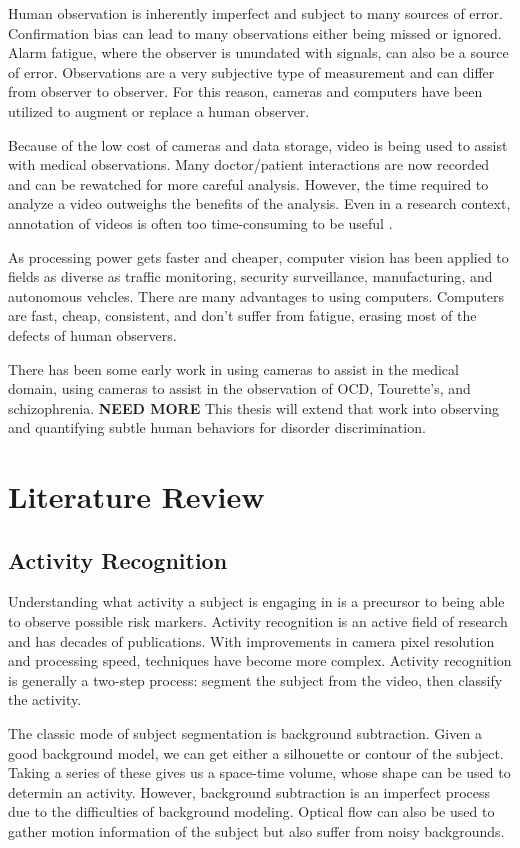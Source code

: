 \documentclass[11pt]{article}
\begin{document}
Human observation is inherently imperfect and subject to many sources of error. Confirmation bias can lead to many observations either being missed or ignored. Alarm fatigue, where the observer is unundated with signals, can also be a source of error. Observations are a very subjective type of measurement and can differ from observer to observer. For this reason, cameras and computers have been utilized to augment or replace a human observer.

Because of the low cost of cameras and data storage, video is being used to assist with medical observations. Many doctor/patient interactions are now recorded and can be rewatched for more careful analysis. However, the time required to analyze a video outweighs the benefits of the analysis. Even in a research context, annotation of videos is often too time-consuming to be useful\cite{fasching2016} \cite{walkup1992}.

As processing power gets faster and cheaper, computer vision has been applied to fields as diverse as traffic monitoring\cite{Gupte}, security surveillance\cite{bird2006}, manufacturing\cite{saurez2018}, and autonomous vehcles. There are many advantages to using computers. Computers are fast, cheap, consistent, and don't suffer from fatigue, erasing most of the defects of human observers.

There has been some early work in using cameras to assist in the medical domain, using cameras to assist in the observation of OCD, Tourette's, and schizophrenia. \textbf{NEED MORE} This thesis will extend that work into observing and quantifying subtle human behaviors for disorder discrimination.

\section{Literature Review}
\subsection{Activity Recognition}
Understanding what activity a subject is engaging in is a precursor to being able to observe possible risk markers. Activity recognition is an active field of research and has decades of publications. With improvements in camera pixel resolution and processing speed, techniques have become more complex. Activity recognition is generally a two-step process: segment the subject from the video, then classify the activity.

The classic mode of subject segmentation is background subtraction\cite{brutzer2011}. Given a good background model, we can get either a silhouette or contour of the subject. Taking a series of these gives us a space-time volume, whose shape can be used to determin an activity. However, background subtraction is an imperfect process due to the difficulties of background modeling. Optical flow can also be used to gather motion information of the subject but also suffer from noisy backgrounds.
\end{document}
